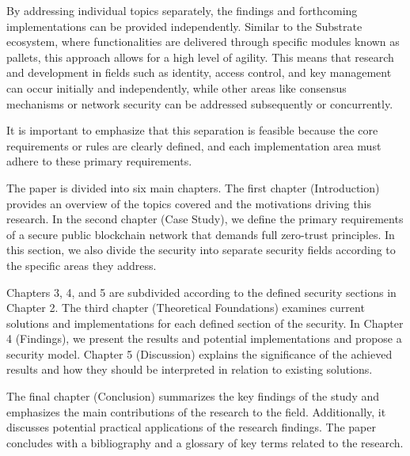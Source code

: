 By addressing individual topics separately, the findings and forthcoming implementations can be provided independently. Similar to the Substrate ecosystem, where functionalities are delivered through specific modules known as pallets, this approach allows for a high level of agility. This means that research and development in fields such as identity, access control, and key management can occur  initially and independently, while other areas like consensus mechanisms or network security can be addressed subsequently or concurrently.

It is important to emphasize that this separation is feasible because the core requirements or rules are clearly defined, and each implementation area must adhere to these primary requirements.

The paper is divided into six main chapters. The first chapter (Introduction) provides an overview of the topics covered and the motivations driving this research. In the second chapter (Case Study), we define the primary requirements of a secure public blockchain network that demands full zero-trust principles. In this section, we also divide the security into separate security fields according to the specific areas they address.

Chapters 3, 4, and 5 are subdivided according to the defined security sections in Chapter 2. The third chapter (Theoretical Foundations) examines current solutions and implementations for each defined section of the security. In Chapter 4 (Findings), we present the results and potential implementations and propose a security model. Chapter 5 (Discussion) explains the significance of the achieved results and how they should be interpreted in relation to existing solutions.

The final chapter (Conclusion) summarizes the key findings of the study and emphasizes the main contributions of the research to the field. Additionally, it discusses potential practical applications of the research findings. The paper concludes with a bibliography and a glossary of key terms related to the research.